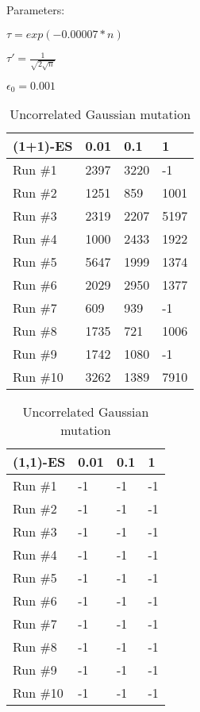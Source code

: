 \documentclass[A4]{article}
\begin{document}
\section{}
\label{sec:p5}

Parameters:

$ \tau = exp(-0.00007 * n) $

$ \tau\ensuremath{'} = \frac{1}{\sqrt{2\sqrt{n}}} $

$ \epsilon_0 = 0.001 $

\begin{table}[H]
	\begin{minipage}{.5\linewidth}
		\centering
		\begin{tabular}{@{}llll@{}}
		\toprule
		(1+1)-ES & 0.01 & 0.1  & 1    \\ \midrule
		Run \#1  & 2397 & 3220 & -1   \\
		Run \#2  & 1251 & 859  & 1001 \\
		Run \#3  & 2319 & 2207 & 5197 \\
		Run \#4  & 1000 & 2433 & 1922 \\
		Run \#5  & 5647 & 1999 & 1374 \\
		Run \#6  & 2029 & 2950 & 1377 \\
		Run \#7  & 609  & 939  & -1   \\
		Run \#8  & 1735 & 721  & 1006 \\
		Run \#9  & 1742 & 1080 & -1   \\
		Run \#10 & 3262 & 1389 & 7910 \\ \bottomrule
		\end{tabular}
	\end{minipage}%
	\begin{minipage}{.5\linewidth}
		\begin{tabular}{@{}llll@{}}
		\toprule
		(1,1)-ES & 0.01 & 0.1 & 1  \\ \midrule
		Run \#1  & -1   & -1  & -1 \\
		Run \#2  & -1   & -1  & -1 \\
		Run \#3  & -1   & -1  & -1 \\
		Run \#4  & -1   & -1  & -1 \\
		Run \#5  & -1   & -1  & -1 \\
		Run \#6  & -1   & -1  & -1 \\
		Run \#7  & -1   & -1  & -1 \\
		Run \#8  & -1   & -1  & -1 \\
		Run \#9  & -1   & -1  & -1 \\
		Run \#10 & -1   & -1  & -1 \\ \bottomrule
		\end{tabular}
	\end{minipage}
	\caption{Uncorrelated Gaussian mutation}
\end{table}
\end{document}
